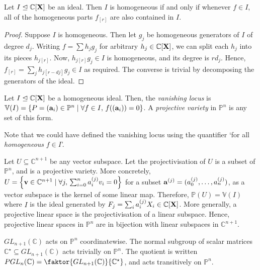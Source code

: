 \begin{lemma}
    Let \( I \trianglelefteq \mathbb C[\vb X] \) be an ideal.
    Then \( I \) is homogeneous if and only if whenever \( f \in I \), all of the homogeneous parts \( f_{[r]} \) are also contained in \( I \).
\end{lemma}
\begin{proof}
    Suppose \( I \) is homogeneous.
    Then let \( g_j \) be homogeneous generators of \( I \) of degree \( d_j \).
    Writing \( f = \sum h_j g_j \) for arbitrary \( h_j \in \mathbb C[\vb X] \), we can split each \( h_j \) into its pieces \( h_{j[r]} \).
    Now, \( h_{j[r]} g_j \in I \) is homogeneous, and its degree is \( rd_j \).
    Hence, \( f_{[r]} = \sum_j h_{j[r-dj]} g_j \in I \) as required.
    The converse is trivial by decomposing the generators of the ideal.
\end{proof}
\begin{definition}
    Let \( I \trianglelefteq \mathbb C[\vb X] \) be a homogeneous ideal.
    Then, the \emph{vanishing locus} is \( \mathbb V(I) = \qty{P = (\vb a_i) \in \mathbb P^n \mid \forall f \in I,\, f((\vb a_i)) = 0} \).
    A \emph{projective variety} in \( \mathbb P^n \) is any set of this form.
\end{definition}
Note that we could have defined the vanishing locus using the quantifier `for all \emph{homogeneous} \( f \in I \)'.
\begin{example}
    Let \( U \subseteq \mathbb C^{n+1} \) be any vector subspace.
    Let the projectivisation of \( U \) is a subset of \( \mathbb P^n \), and is a projective variety.
    More concretely, \( U = \qty{\vb v \in \mathbb C^{n+1} \mid \forall j,\, \sum_{i=0}^n a_i^{(j)} v_i = 0} \) for a subset \( \vb a^{(j)} = (a_0^{(j)}, \dots, a_n^{(j)}) \), as a vector subspace is the kernel of some linear map.
    Therefore, \( \mathbb P(U) = \mathbb V(I) \) where \( I \) is the ideal generated by \( F_j = \sum_i a^{(j)}_i X_i \in \mathbb C[\vb X] \).
    More generally, a projective linear space is the projectivisation of a linear subspace.
    Hence, projective linear spaces in \( \mathbb P^n \) are in bijection with linear subspaces in \( \mathbb C^{n+1} \).
\end{example}
\( GL_{n+1}(\mathbb C) \) acts on \( \mathbb P^n \) coordinatewise.
The normal subgroup of scalar matrices \( \mathbb C^\star \subseteq GL_{n+1}(\mathbb C) \) acts trivially on \( \mathbb P^n \).
The quotient is written \( PGL_n(\mathbb C) = \faktor{GL_{n+1}(\mathbb C)}{\mathbb C^\star} \), and acts transitively on \( \mathbb P^n \).
